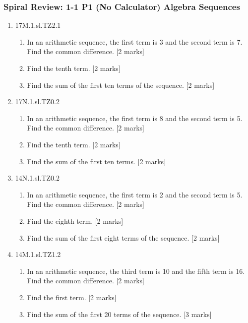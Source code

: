 \documentclass[12pt, twoside]{article}
\begin{document}
\subsubsection*{Spiral Review: 1-1 P1 (No Calculator) Algebra Sequences}
 \begin{enumerate}

  \item 17M.1.sl.TZ2.1
  \begin{enumerate}
    \item In an arithmetic sequence, the first term is 3 and the second term is 7.\\
    Find the common difference. [2 marks]
    \item Find the tenth term. [2 marks]
    \item Find the sum of the first ten terms of the sequence. [2 marks]
  \end{enumerate}

  \item 17N.1.sl.TZ0.2
  \begin{enumerate}
    \item In an arithmetic sequence, the first term is 8 and the second term is 5.\\
    Find the common difference. [2 marks]
    \item Find the tenth term. [2 marks]
    \item Find the sum of the first ten terms. [2 marks]
  \end{enumerate}

  \item 14N.1.sl.TZ0.2
  \begin{enumerate}
    \item In an arithmetic sequence, the first term is 2 and the second term is 5.\\
    Find the common difference. [2 marks]
    \item Find the eighth term. [2 marks]
    \item Find the sum of the first eight terms of the sequence. [2 marks]
  \end{enumerate}

  \item 14M.1.sl.TZ1.2
  \begin{enumerate}
    \item In an arithmetic sequence, the third term is 10 and the fifth term is 16.\\
    Find the common difference. [2 marks]
    \item Find the first term. [2 marks]
    \item Find the sum of the first 20 terms of the sequence. [3 marks]
  \end{enumerate}


\end{enumerate}
\end{document}
